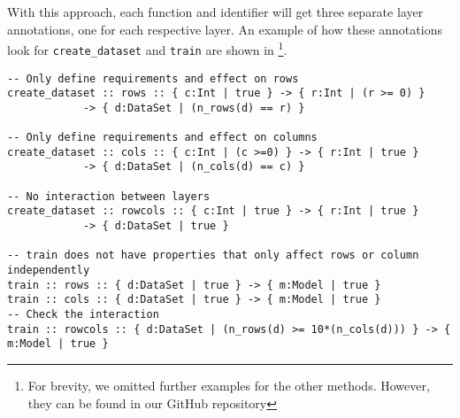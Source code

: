 With this approach, each function and identifier will get three separate layer annotations, one for each respective layer. An example of how these annotations look for \texttt{create\_dataset} and \texttt{train} are shown in \footnote{For brevity, we omitted further examples for the other methods. However, they can be found in our GitHub repository}.

\begin{lstlisting}[numbers=none,caption={Liquid signatures for separate layers},label={lst:uc2_separate_liq_sigs},tabsize=4]
-- Only define requirements and effect on rows
create_dataset :: rows :: { c:Int | true } -> { r:Int | (r >= 0) } 
			-> { d:DataSet | (n_rows(d) == r) }

-- Only define requirements and effect on columns
create_dataset :: cols :: { c:Int | (c >=0) } -> { r:Int | true } 
			-> { d:DataSet | (n_cols(d) == c) }

-- No interaction between layers
create_dataset :: rowcols :: { c:Int | true } -> { r:Int | true } 
			-> { d:DataSet | true }

-- train does not have properties that only affect rows or column independently
train :: rows :: { d:DataSet | true } -> { m:Model | true }
train :: cols :: { d:DataSet | true } -> { m:Model | true }
-- Check the interaction
train :: rowcols :: { d:DataSet | (n_rows(d) >= 10*(n_cols(d))) } -> { m:Model | true }
\end{lstlisting}

